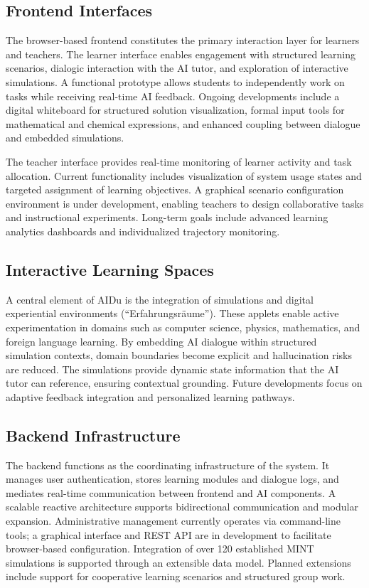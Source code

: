 \documentclass[10pt,twocolumn]{article}
\begin{document}
\subsection{Frontend Interfaces}\label{frontend-interfaces}

The browser-based frontend constitutes the primary interaction layer for
learners and teachers. The learner interface enables engagement with
structured learning scenarios, dialogic interaction with the AI tutor,
and exploration of interactive simulations. A functional prototype
allows students to independently work on tasks while receiving real-time
AI feedback. Ongoing developments include a digital whiteboard for
structured solution visualization, formal input tools for mathematical
and chemical expressions, and enhanced coupling between dialogue and
embedded simulations.

The teacher interface provides real-time monitoring of learner activity
and task allocation. Current functionality includes visualization of
system usage states and targeted assignment of learning objectives. A
graphical scenario configuration environment is under development,
enabling teachers to design collaborative tasks and instructional
experiments. Long-term goals include advanced learning analytics
dashboards and individualized trajectory monitoring.

\subsection{Interactive Learning
Spaces}\label{interactive-learning-spaces}

A central element of AIDu is the integration of simulations and digital
experiential environments (``Erfahrungsräume''). These applets enable
active experimentation in domains such as computer science, physics,
mathematics, and foreign language learning. By embedding AI dialogue
within structured simulation contexts, domain boundaries become explicit
and hallucination risks are reduced. The simulations provide dynamic
state information that the AI tutor can reference, ensuring contextual
grounding. Future developments focus on adaptive feedback integration
and personalized learning pathways.

\subsection{Backend Infrastructure}\label{backend-infrastructure}

The backend functions as the coordinating infrastructure of the system.
It manages user authentication, stores learning modules and dialogue
logs, and mediates real-time communication between frontend and AI
components. A scalable reactive architecture supports bidirectional
communication and modular expansion. Administrative management currently
operates via command-line tools; a graphical interface and REST API are
in development to facilitate browser-based configuration. Integration of
over 120 established MINT simulations is supported through an extensible
data model. Planned extensions include support for cooperative learning
scenarios and structured group work.
\end{document}
